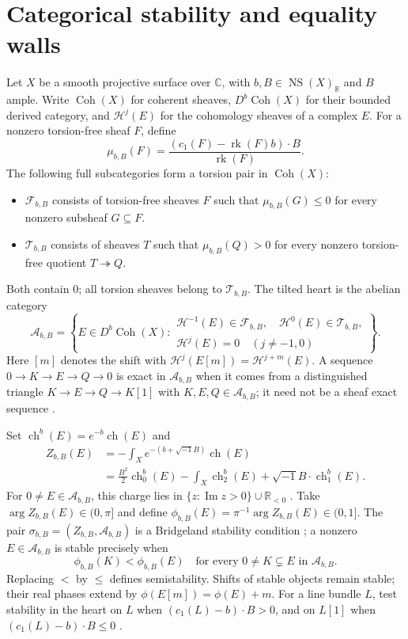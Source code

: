 \documentclass[12pt,reqno]{amsart}
\numberwithin{equation}{section}
\theoremstyle{plain}
\theoremstyle{definition}
\theoremstyle{remark}
\newcommand{\ii}{\sqrt{-1}}
\newcommand{\R}{\mathbb R}
\newcommand{\NS}{\operatorname{NS}}
\newcommand{\ch}{\operatorname{ch}}
\newcommand{\Coh}{\operatorname{Coh}}
\newcommand{\Ima}{\operatorname{Im}}
\begin{document}
\section{Categorical stability and equality walls}\label{sec:stability}
Let $X$ be a smooth projective surface over $\mathbb C$, with
$b,B\in\NS(X)_\R$ and $B$ ample. Write $\Coh(X)$ for coherent sheaves,
$D^b\Coh(X)$ for their bounded derived category, and $\mathcal H^j(E)$
for the cohomology sheaves of a complex $E$.
For a nonzero torsion-free sheaf $F$, define
\[
 \mu_{b,B}(F)=\frac{(c_1(F)-\operatorname{rk}(F)b)\cdot B}
 {\operatorname{rk}(F)}.
\]
The following full subcategories form a torsion pair in $\Coh(X)$:
\begin{itemize}
\item $\mathcal F_{b,B}$ consists of torsion-free sheaves $F$ such that
$\mu_{b,B}(G)\le0$ for every nonzero subsheaf $G\subseteq F$.
\item $\mathcal T_{b,B}$ consists of sheaves $T$ such that
$\mu_{b,B}(Q)>0$ for every nonzero torsion-free quotient $T\twoheadrightarrow Q$.
\end{itemize}
Both contain $0$; all torsion sheaves belong to $\mathcal T_{b,B}$.
The tilted heart is the abelian category
\[
 \mathcal A_{b,B}=\left\{E\in D^b\Coh(X):
 \begin{array}{l}
 \mathcal H^{-1}(E)\in\mathcal F_{b,B},\quad
 \mathcal H^0(E)\in\mathcal T_{b,B},\\
 \mathcal H^j(E)=0\quad(j\ne-1,0)
 \end{array}\right\}.
\]
Here $[m]$ denotes the shift with
$\mathcal H^j(E[m])=\mathcal H^{j+m}(E)$.
A sequence $0\to K\to E\to Q\to0$ is exact in $\mathcal A_{b,B}$
when it comes from a distinguished triangle $K\to E\to Q\to K[1]$
with $K,E,Q\in\mathcal A_{b,B}$; it need not be a sheaf exact sequence
\cite[Section 2]{AB}.

Set $\ch^b(E)=e^{-b}\ch(E)$ and
\[
 \begin{aligned}
 Z_{b,B}(E)&=-\int_Xe^{-(b+\ii B)}\ch(E)\\
 &=\frac{B^2}{2}\ch_0^b(E)-\int_X\ch_2^b(E)
   +\ii B\cdot\ch_1^b(E).
 \end{aligned}
\]
For $0\ne E\in\mathcal A_{b,B}$, this charge lies in
$\{z:\Ima z>0\}\cup\R_{<0}$ \cite[Corollary 2.1]{AB}.
Take $\arg Z_{b,B}(E)\in(0,\pi]$ and define
$\phi_{b,B}(E)=\pi^{-1}\arg Z_{b,B}(E)\in(0,1]$.
The pair $\sigma_{b,B}=(Z_{b,B},\mathcal A_{b,B})$ is a Bridgeland
stability condition \cite[Section 2]{AB}; a nonzero $E\in\mathcal A_{b,B}$
is stable precisely when
\[
 \phi_{b,B}(K)<\phi_{b,B}(E)
 \quad\text{for every }0\ne K\subsetneq E
 \text{ in }\mathcal A_{b,B}.
\]
Replacing $<$ by $\le$ defines semistability.
Shifts of stable objects remain stable; their real phases extend by
$\phi(E[m])=\phi(E)+m$.
For a line bundle $L$, test stability in the heart on $L$ when
$(c_1(L)-b)\cdot B>0$, and on $L[1]$ when
$(c_1(L)-b)\cdot B\le0$ \cite[Section 2.1]{Makela}.
\end{document}

